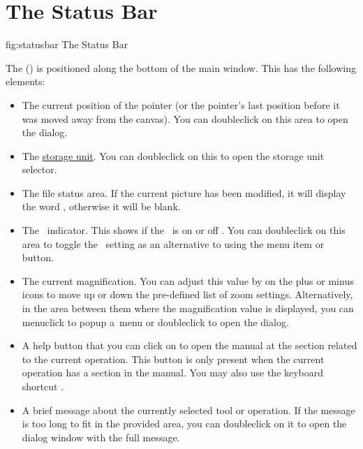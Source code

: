 \section{The Status Bar}\label{sec:thestatusbar}

\FloatFig
  {fig:statusbar}
  {}
  {The Status Bar}

The  () is positioned along
the bottom of the main window. This has the following elements:

\begin{itemize}

\item The current position of the pointer (or the pointer's last
position before it was moved away from the \gls{canvas}). You can
\gls{doubleclick} on this area to open the  dialog.

\item The \hyperref[sec:controlsettings]{storage unit}. You
can \gls{doubleclick} on this to open the storage unit selector.

\item The file status area.  If the current picture has been modified, it
will display the word , otherwise it
will be blank.

\item The \gridlock\ indicator. This shows if the \gridlock\ is on
 or off . You can
\gls{doubleclick} on this area to toggle the \gridlock\ setting as an
alternative to using the  menu item or
button.

\item The current magnification. You can adjust this value by
 on the plus or minus icons to move up or
down the pre-defined list of zoom settings. Alternatively, in the area
between them where the magnification value is displayed, you can
\gls{menuclick} to popup a~menu or \gls{doubleclick} to open the
 dialog.

\item A help button  that you can \gls{click} on
to open the manual at the section related to the current operation.
This button is only present when the current operation has a section
in the manual. You may also use the keyboard shortcut
.

\item A brief message about the currently selected tool or
operation. If the message is too long to fit in the provided area,
you can \gls{doubleclick} on it to open the  dialog window with the
full message.

\end{itemize}

